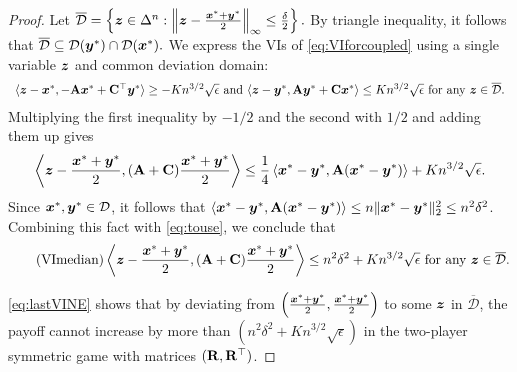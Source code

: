 \begin{proof}
\noindent Let $\overline{\mathcal{D}} = \left\{{\bm{z}} \in \Delta^n: \left\|{\bm{z}}-\frac{{\bm{x}}^*+{\bm{y}}^*}{2}\right\| _{\infty}\leq \frac{\delta}{2}\right\}.$ By triangle inequality, it follows that 
$\overline{\mathcal{D}} \subseteq \mathcal{D}({\bm{y}}^*)\cap\mathcal{D}({\bm{x}}^*).$
We express the VIs of \eqref{eq:VIforcoupled} using a single variable ${\bm{z}}$ and common deviation domain:
\begin{equation*}
\label{eq:VIforcoupledz}
\begin{array}{cc}
\langle {\bm{z}} - {\bm{x}}^*,-\mathbf{A}{\bm{x}}^*+\mathbf{C}^{\top}{\bm{y}}^*  \rangle \geq -Kn^{3/2}\sqrt{\epsilon} \textrm{ and } 
\langle {\bm{z}} - {\bm{y}}^*,\mathbf{A}{\bm{y}}^*+\mathbf{C}{\bm{x}}^*  \rangle \leq Kn^{3/2}\sqrt{\epsilon} \textrm{ for any }{\bm{z}} \in \overline{\mathcal{D}}.
\end{array}
\end{equation*}
Multiplying the first inequality by $-1/2$ and the second with $1/2$ and adding them up gives
\begin{equation}
\label{eq:touse}
\left\langle {\bm{z}} - \frac{{\bm{x}}^*+{\bm{y}}^*}{2}, (\mathbf{A}+\mathbf{C})\frac{{\bm{x}}^*+{\bm{y}}^*}{2} \right\rangle \leq \frac{1}{4}\left\langle {\bm{x}}^*-{\bm{y}}^*,\mathbf{A}({\bm{x}}^*-{\bm{y}}^*)\right\rangle + Kn^{3/2}\sqrt{\epsilon}. 
\end{equation}
Since ${\bm{x}}^*,{\bm{y}}^* \in \mathcal{D}$, it follows that $\left\langle {\bm{x}}^*-{\bm{y}}^*,\mathbf{A}({\bm{x}}^*-{\bm{y}}^*)\right\rangle \leq n \|{\bm{x}}^*-{\bm{y}}^*\|^2_2 \leq n^2 \delta^2$. 
Combining this fact with \eqref{eq:touse}, we conclude that
\begin{equation}
\tag{VImedian}
\label{eq:lastVINE}
\left\langle {\bm{z}} - \frac{{\bm{x}}^*+{\bm{y}}^*}{2}, (\mathbf{A}+\mathbf{C})\frac{{\bm{x}}^*+{\bm{y}}^*}{2} \right\rangle \leq n^2 \delta^2 + Kn^{3/2}\sqrt{\epsilon} \textrm{ for any }{\bm{z}} \in \overline{\mathcal{D}}. 
\end{equation}

\eqref{eq:lastVINE} shows that by deviating from $\left(\frac{{\bm{x}}^*+{\bm{y}}^*}{2},\frac{{\bm{x}}^*+{\bm{y}}^*}{2}\right)$ to some ${\bm{z}}$ in $\overline{\mathcal{D}}$, the payoff cannot increase by more than $\left(n^2\delta^2 + Kn^{3/2}\sqrt{\epsilon}\right)$ in the two-player symmetric game with matrices $(\mathbf{R},\mathbf{R}^{\top})$.


\end{proof}
